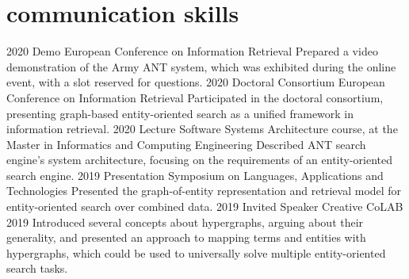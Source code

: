 \documentclass{friggeri-cv}
\begin{document}
\section{communication skills}

\begin{entrylist}
\entry
{2020}
{Demo}
{European Conference on Information Retrieval}
{Prepared a video demonstration of the Army ANT system, which was exhibited during the online event, with a slot reserved for questions.}
\entry
{2020}
{Doctoral Consortium}
{European Conference on Information Retrieval}
{Participated in the doctoral consortium, presenting graph-based entity-oriented search as a unified framework in information retrieval.}
\entry
{2020}
{Lecture}
{Software Systems Architecture course, at the Master in Informatics and Computing Engineering}
{Described ANT search engine's system architecture, focusing on the requirements of an entity-oriented search engine.}
\entry
{2019}
{Presentation}
{Symposium on Languages, Applications and Technologies}
{Presented the graph-of-entity representation and retrieval model for entity-oriented search over combined data.}
\entry
{2019}
{Invited Speaker}
{Creative CoLAB 2019}
{Introduced several concepts about hypergraphs, arguing about their generality, and presented an approach to mapping terms and entities with hypergraphs, which could be used to universally solve multiple entity-oriented search tasks.}
\end{entrylist}
\end{document}
